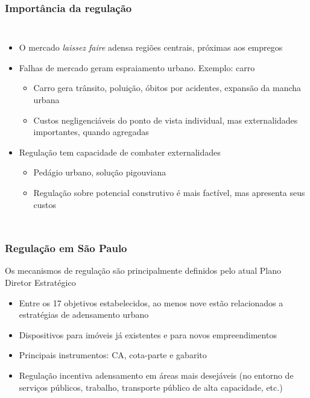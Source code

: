 \documentclass[%
    8pt, 
    aspectratio=169,
]{beamer}
\begin{document}
\begin{frame}
    \frametitle{Importância da regulação}

    \begin{columns}
        \begin{itemize}
            \item O mercado \textit{laissez faire} adensa regiões centrais, próximas aos empregos
            
            \item Falhas de mercado geram espraiamento urbano. Exemplo: carro
            \begin{itemize}
                \item Carro gera trânsito, poluição, óbitos por acidentes, expansão da mancha urbana
                \item Custos negligenciáveis do ponto de vista individual, mas externalidades importantes, quando agregadas
            \end{itemize}
            \item Regulação tem capacidade de combater externalidades
            \begin{itemize}
                \item Pedágio urbano, solução pigouviana
                \item Regulação sobre potencial construtivo é mais factível, mas apresenta seus custos
            \end{itemize}
        \end{itemize}

        
    \end{columns}
\end{frame}

\begin{frame}
    \frametitle{Regulação em São Paulo}

    Os mecanismos de regulação são principalmente definidos pelo atual Plano Diretor Estratégico

    \begin{itemize}
        \item Entre os 17 objetivos estabelecidos, ao menos nove estão relacionados a estratégias de adensamento urbano \cite{lima2021alem}
        \item Dispositivos para imóveis já existentes e para novos empreendimentos
        \item Principais instrumentos: CA, cota-parte e gabarito
        \item Regulação incentiva adensamento em áreas mais desejáveis (no entorno de serviços públicos, trabalho, transporte público de alta capacidade, etc.)
    \end{itemize}
\end{frame}
\end{document}
